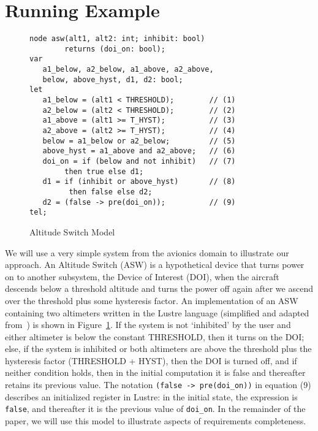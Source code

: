 \section{Running Example}
\label{sec:example}


\begin{figure}[t]
\centering
{\smaller
\begin{verbatim}
node asw(alt1, alt2: int; inhibit: bool)
        returns (doi_on: bool);
var
   a1_below, a2_below, a1_above, a2_above,
   below, above_hyst, d1, d2: bool;
let
   a1_below = (alt1 < THRESHOLD);        // (1)
   a2_below = (alt2 < THRESHOLD);        // (2)
   a1_above = (alt1 >= T_HYST);          // (3)
   a2_above = (alt2 >= T_HYST);          // (4)
   below = a1_below or a2_below;         // (5)
   above_hyst = a1_above and a2_above;   // (6)
   doi_on = if (below and not inhibit)   // (7)
        then true else d1;
   d1 = if (inhibit or above_hyst)       // (8)
         then false else d2;
   d2 = (false -> pre(doi_on));          // (9)
tel;
\end{verbatim}
}
\vspace{-0.1in}
\caption{Altitude Switch Model}
\label{fig:asw}
\end{figure}

We will use a very simple system from the avionics domain to illustrate our approach. An Altitude Switch (ASW) is a hypothetical device that turns power on to another subsystem, the Device of Interest (DOI), when the aircraft descends below a threshold altitude and turns the power off again after we ascend over the threshold plus some hysteresis factor.  An implementation of an ASW containing two altimeters written in the Lustre language (simplified and adapted from~\cite{HCW02:ase-deviation}) is shown in Figure~\ref{fig:asw}.  If the system is not `inhibited' by the user and either altimeter is below the constant THRESHOLD, then it turns on the DOI; else, if the system is inhibited or both altimeters are above the threshold plus the hysteresis factor (THRESHOLD + HYST), then the DOI is turned off, and if neither condition holds, then in the initial computation it is false and thereafter retains its previous value.  The notation \texttt{(false -> pre(doi\_on))} in equation (9) describes an initialized register in Lustre: in the initial state, the expression is \texttt{false}, and thereafter it is the previous value of \texttt{doi\_on}.  In the remainder of the paper, we will use this model to illustrate aspects of requirements completeness.  %



